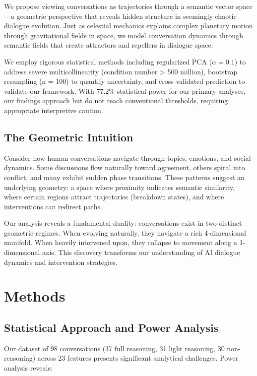 \documentclass[11pt,letterpaper]{article}
\newcommand{\totalConversations}{98}
\newcommand{\fullReasoningCount}{37}
\newcommand{\lightReasoningCount}{31}
\newcommand{\nonReasoningCount}{30}
\newcommand{\featureCount}{23}
\newcommand{\powerOutcomeGroups}{77.2\%}
\newcommand{\regularizationAlpha}{0.1}
\newcommand{\bootstrapSamples}{100}
\begin{document}
We propose viewing conversations as trajectories through a semantic vector space—a geometric perspective that reveals hidden structure in seemingly chaotic dialogue evolution. Just as celestial mechanics explains complex planetary motion through gravitational fields in space, we model conversation dynamics through semantic fields that create attractors and repellers in dialogue space.

We employ rigorous statistical methods including regularized PCA ($\alpha = \regularizationAlpha{}$) to address severe multicollinearity (condition number > 500 million), bootstrap resampling (n = \bootstrapSamples{}) to quantify uncertainty, and cross-validated prediction to validate our framework. With \powerOutcomeGroups{} statistical power for our primary analyses, our findings approach but do not reach conventional thresholds, requiring appropriate interpretive caution.

\subsection{The Geometric Intuition}

Consider how human conversations navigate through topics, emotions, and social dynamics. Some discussions flow naturally toward agreement, others spiral into conflict, and many exhibit sudden phase transitions. These patterns suggest an underlying geometry: a space where proximity indicates semantic similarity, where certain regions attract trajectories (breakdown states), and where interventions can redirect paths.

Our analysis reveals a fundamental duality: conversations exist in two distinct geometric regimes. When evolving naturally, they navigate a rich 4-dimensional manifold. When heavily intervened upon, they collapse to movement along a 1-dimensional axis. This discovery transforms our understanding of AI dialogue dynamics and intervention strategies.

\section{Methods}

\subsection{Statistical Approach and Power Analysis}

Our dataset of \totalConversations{} conversations (\fullReasoningCount{} full reasoning, \lightReasoningCount{} light reasoning, \nonReasoningCount{} non-reasoning) across \featureCount{} features presents significant analytical challenges. Power analysis reveals:
\end{document}
